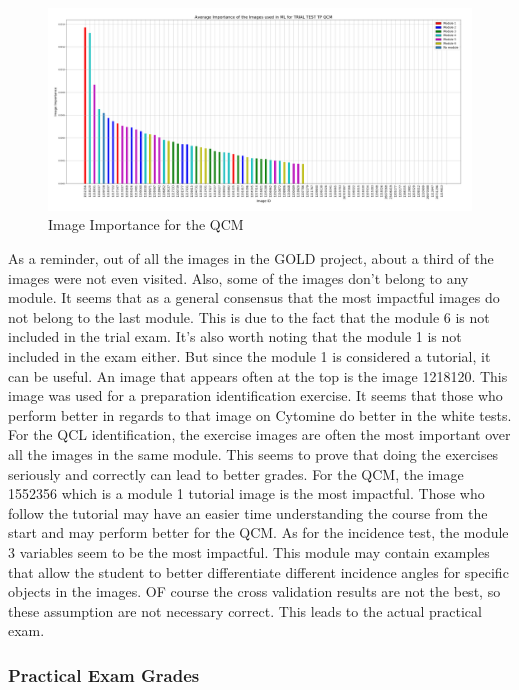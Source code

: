 \documentclass[a4paper,11pt]{report}
\numberwithin{figure}{section} %
\begin{document}
      \begin{figure}[H]
      \centering
      \includegraphics[width=.95\linewidth]{im_importance_TRIAL_TEST_TP_QCM_2018-04-29_14_34_19.png}
      \caption{Image Importance for the QCM}
      \label{fig:im_white3}
      \end{figure}
    
    As a reminder, out of all the images in the GOLD project, about a third of the images were not even visited.
    Also, some of the images don't belong to any module.
    It seems that as a general consensus that the most impactful images do not belong to the last module.
    This is due to the fact that the module 6 is not included in the trial exam.
    It's also worth noting that the module 1 is not included in the exam either.
    But since the module 1 is considered a tutorial, it can be useful.
    An image that appears often at the top is the image 1218120.
    This image was used for a preparation identification exercise.
    It seems that those who perform better in regards to that image on Cytomine do better in the white tests.
    For the QCL identification, the exercise images are often the most important over all the images in the same module.
    This seems to prove that doing the exercises seriously and correctly can lead to better grades.
    For the QCM, the image 1552356 which is a module 1 tutorial image is the most impactful.
    Those who follow the tutorial may have an easier time understanding the course from the start and may perform better for the QCM. As for the incidence test, the module 3 variables seem to be the most impactful.
    This module may contain examples that allow the student to better differentiate different incidence angles for specific objects in the images.
    OF course the cross validation results are not the best, so these assumption are not necessary correct. This leads to the actual practical exam.
    
    \subsubsection{Practical Exam Grades}
\end{document}
